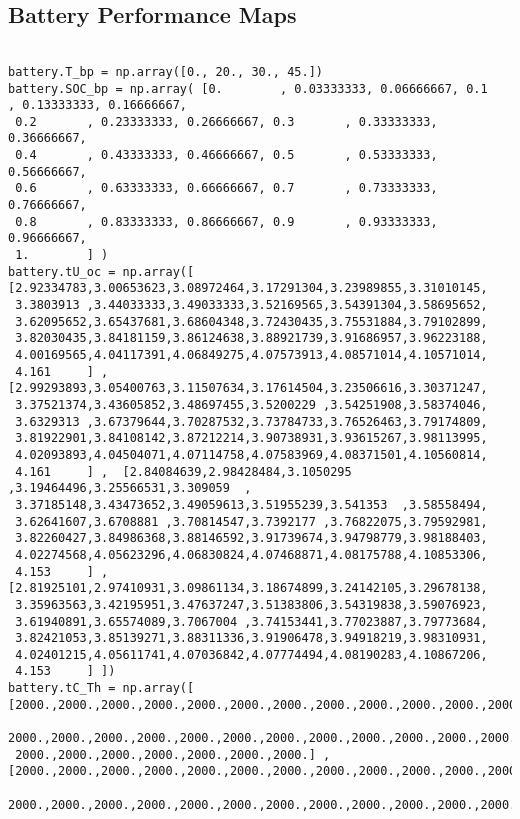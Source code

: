 \subsection{Battery Performance Maps}
\begin{verbatim}

battery.T_bp = np.array([0., 20., 30., 45.])
battery.SOC_bp = np.array( [0.        , 0.03333333, 0.06666667, 0.1       , 0.13333333, 0.16666667,
 0.2       , 0.23333333, 0.26666667, 0.3       , 0.33333333, 0.36666667,
 0.4       , 0.43333333, 0.46666667, 0.5       , 0.53333333, 0.56666667,
 0.6       , 0.63333333, 0.66666667, 0.7       , 0.73333333, 0.76666667,
 0.8       , 0.83333333, 0.86666667, 0.9       , 0.93333333, 0.96666667,
 1.        ] )
battery.tU_oc = np.array([ [2.92334783,3.00653623,3.08972464,3.17291304,3.23989855,3.31010145,
 3.3803913 ,3.44033333,3.49033333,3.52169565,3.54391304,3.58695652,
 3.62095652,3.65437681,3.68604348,3.72430435,3.75531884,3.79102899,
 3.82030435,3.84181159,3.86124638,3.88921739,3.91686957,3.96223188,
 4.00169565,4.04117391,4.06849275,4.07573913,4.08571014,4.10571014,
 4.161     ] ,  [2.99293893,3.05400763,3.11507634,3.17614504,3.23506616,3.30371247,
 3.37521374,3.43605852,3.48697455,3.5200229 ,3.54251908,3.58374046,
 3.6329313 ,3.67379644,3.70287532,3.73784733,3.76526463,3.79174809,
 3.81922901,3.84108142,3.87212214,3.90738931,3.93615267,3.98113995,
 4.02093893,4.04504071,4.07114758,4.07583969,4.08371501,4.10560814,
 4.161     ] ,  [2.84084639,2.98428484,3.1050295 ,3.19464496,3.25566531,3.309059  ,
 3.37185148,3.43473652,3.49059613,3.51955239,3.541353  ,3.58558494,
 3.62641607,3.6708881 ,3.70814547,3.7392177 ,3.76822075,3.79592981,
 3.82260427,3.84986368,3.88146592,3.91739674,3.94798779,3.98188403,
 4.02274568,4.05623296,4.06830824,4.07468871,4.08175788,4.10853306,
 4.153     ] ,  [2.81925101,2.97410931,3.09861134,3.18674899,3.24142105,3.29678138,
 3.35963563,3.42195951,3.47637247,3.51383806,3.54319838,3.59076923,
 3.61940891,3.65574089,3.7067004 ,3.74153441,3.77023887,3.79773684,
 3.82421053,3.85139271,3.88311336,3.91906478,3.94918219,3.98310931,
 4.02401215,4.05611741,4.07036842,4.07774494,4.08190283,4.10867206,
 4.153     ] ])
battery.tC_Th = np.array([ [2000.,2000.,2000.,2000.,2000.,2000.,2000.,2000.,2000.,2000.,2000.,2000.,
 2000.,2000.,2000.,2000.,2000.,2000.,2000.,2000.,2000.,2000.,2000.,2000.,
 2000.,2000.,2000.,2000.,2000.,2000.,2000.] ,  [2000.,2000.,2000.,2000.,2000.,2000.,2000.,2000.,2000.,2000.,2000.,2000.,
 2000.,2000.,2000.,2000.,2000.,2000.,2000.,2000.,2000.,2000.,2000.,2000.,

\end{verbatim}
